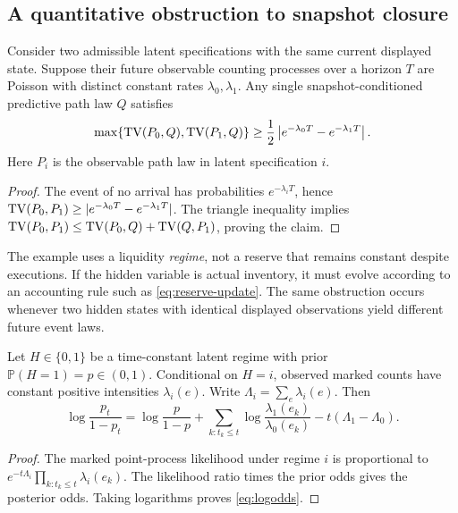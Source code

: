\subsection{A quantitative obstruction to snapshot closure}
\begin{theorem}\label{thm:snapshot}
Consider two admissible latent specifications with the same current displayed state. Suppose their future observable counting processes over a horizon $T$ are Poisson with distinct constant rates $\lambda_0,\lambda_1$. Any single snapshot-conditioned predictive path law $Q$ satisfies
\begin{equation}\label{eq:snapshot-lower}
 \max\{\operatorname{TV}(P_0,Q),\operatorname{TV}(P_1,Q)\}
 \ge \frac12\left|e^{-\lambda_0T}-e^{-\lambda_1T}\right|.
\end{equation}
Here $P_i$ is the observable path law in latent specification $i$.
\end{theorem}
\begin{proof}
The event of no arrival has probabilities $e^{-\lambda_iT}$, hence
$\operatorname{TV}(P_0,P_1)\ge|e^{-\lambda_0T}-e^{-\lambda_1T}|$.
The triangle inequality implies
$\operatorname{TV}(P_0,P_1)\le\operatorname{TV}(P_0,Q)+\operatorname{TV}(Q,P_1)$, proving the claim.
\end{proof}

The example uses a liquidity \emph{regime}, not a reserve that remains constant despite executions. If the hidden variable is actual inventory, it must evolve according to an accounting rule such as \eqref{eq:reserve-update}. The same obstruction occurs whenever two hidden states with identical displayed observations yield different future event laws.

\begin{proposition}\label{prop:poisson-filter}
Let $H\in\{0,1\}$ be a time-constant latent regime with prior
$\mathbb P(H=1)=p\in(0,1)$. Conditional on $H=i$, observed marked counts have constant positive intensities $\lambda_i(e)$. Write
$\Lambda_i=\sum_e\lambda_i(e)$. Then
\begin{equation}\label{eq:logodds}
 \log\frac{p_t}{1-p_t}
 =\log\frac p{1-p}
 +\sum_{k:t_k\le t}\log\frac{\lambda_1(e_k)}{\lambda_0(e_k)}
 -t(\Lambda_1-\Lambda_0).
\end{equation}
\end{proposition}
\begin{proof}
The marked point-process likelihood under regime $i$ is proportional to
$e^{-t\Lambda_i}\prod_{k:t_k\le t}\lambda_i(e_k)$.
The likelihood ratio times the prior odds gives the posterior odds. Taking logarithms proves \eqref{eq:logodds}.
\end{proof}

